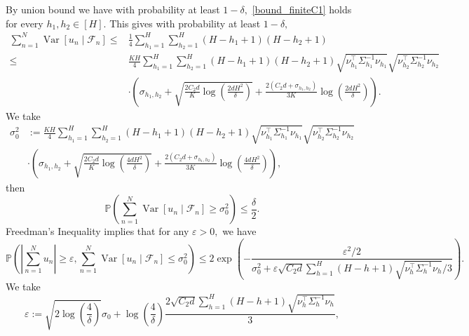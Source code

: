 \documentclass{article}
\numberwithin{equation}{section}
\theoremstyle{plain}
\theoremstyle{definition}
\theoremstyle{remark}
\begin{document}
By union bound we have with probability at least $1 - \delta,$ \eqref{bound_finiteC1} holds for every $h_1,h_2 \in [H].$ This gives with probability at least $1 - \delta,$
\begin{align*}
    \sum_{n=1}^{N} \operatorname{Var}\left[u_{n} \mid \mathcal{F}_{n}\right]
    \leq & \frac{1}{4} \sum_{h_{1}=1}^{H}\sum_{h_{2}=1}^{H} \left(H-h_{1}+1\right)\left(H-h_{2}+1\right)\\
    \leq & \frac{KH}{4}  \sum_{h_{1}=1}^{H}\sum_{h_{2}=1}^{H} \left(H-h_{1}+1\right)\left(H-h_{2}+1\right) \sqrt{\nu_{h_1}^{\top} \Sigma_{h_1}^{-1} \nu_{h_1}} \sqrt{\nu_{h_2}^{\top} \Sigma_{h_2}^{-1} \nu_{h_2}} \\
    & \cdot \left(\sigma_{h_1,h_2} + \sqrt{\frac{2C_2 d}{K}\log\left(\frac{2dH^2}{\delta}\right)} + \frac{2\left(C_2d+\sigma_{h_1,h_2}\right)}{3 K}\log\left(\frac{2dH^2}{\delta}\right)\right).
\end{align*}
We take
\begin{align*}
    \sigma^2_0 &:= \frac{KH}{4}  \sum_{h_{1}=1}^{H}\sum_{h_{2}=1}^{H} \left(H-h_{1}+1\right)\left(H-h_{2}+1\right) \sqrt{\nu_{h_1}^{\top} \Sigma_{h_1}^{-1} \nu_{h_1}} \sqrt{\nu_{h_2}^{\top} \Sigma_{h_2}^{-1} \nu_{h_2}} \\
    & \cdot \left(\sigma_{h_1,h_2} + \sqrt{\frac{2C_2 d}{K}\log\left(\frac{4dH^2}{\delta}\right)} + \frac{2\left(C_2d+\sigma_{h_1,h_2}\right)}{3 K}\log\left(\frac{4dH^2}{\delta}\right)\right),
\end{align*}
then
\begin{equation*}
    \mathbb{P}\left(\sum_{n=1}^{N} \operatorname{Var}\left[u_{n} \mid \mathcal{F}_{n}\right] \geq \sigma^2_0 \right) \leq \frac{\delta}{2}.
\end{equation*}
Freedman's Inequality implies that for any $\varepsilon > 0,$ we have
\begin{equation*}
    \mathbb{P}\left(\left|\sum_{n=1}^N u_n\right| \geq \varepsilon, \sum_{n=1}^{N} \operatorname{Var}\left[u_{n} \mid \mathcal{F}_{n}\right] \leq \sigma^2_0\right) \leq 2\exp\left(-\frac{\varepsilon^2/2}{\sigma^2_0 + \varepsilon \sqrt{C_{2} d} \sum_{h=1}^{H}(H-h+1) \sqrt{\nu_{h}^{\top} \Sigma_{h}^{-1} \nu_{h}} / 3}\right).
\end{equation*}
We take
\begin{equation*}
    \varepsilon := \sqrt{2 \log\left(\frac{4}{\delta}\right)} \sigma_0 + \log\left(\frac{4}{\delta}\right)\frac{2 \sqrt{C_{2} d} \sum_{h=1}^{H}(H-h+1) \sqrt{\nu_{h}^{\top} \Sigma_{h}^{-1} \nu_{h}}}{3},
\end{equation*}
\end{document}
